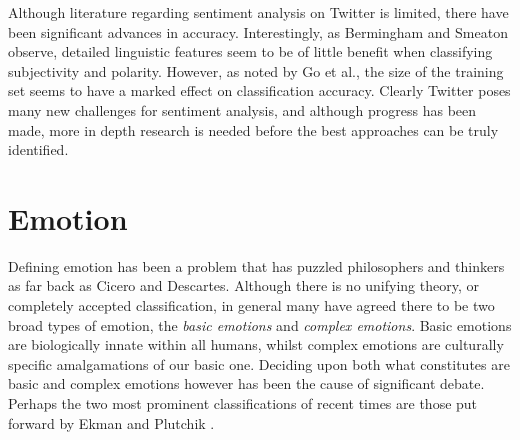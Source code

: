 Although literature regarding sentiment analysis on Twitter is limited, there have been significant advances in accuracy. Interestingly, as Bermingham and Smeaton observe, detailed linguistic features seem to be of little benefit when classifying subjectivity and polarity. However, as noted by Go et al., the size of the training set seems to have a marked effect on classification accuracy. Clearly Twitter poses many new challenges for sentiment analysis, and although progress has been made, more in depth research is needed before the best approaches can be truly identified.

\begin{comment}

Understanding sentiment on Twitter however, requires slight changes to our approach. We will assume that opinion expressed within a tweet is the user's own, and that the time at which a tweet is posted reflects the time at which any opinion in it was cast. This leaves us with three core problems. First we must determine whether a tweet contains an opinion, and if so, we must be able to both classify it and determine it's topic. Research into Twitter-targeted sentiment analysis is limited, however, due to the length constraints placed upon tweets, aspects of sentence-level classification still bare relevance. Furthemore work such as Bermingham' \cite{Bermingham:2010vh} and Barbosa's \cite{Barbosa:ws} highlight some key variations in approach to sentiment analysis on Twitter.

\cite{Barbosa:ws} - suggests 2-step framework, subjectivity detetction then classification
\cite{Barbosa:ws} - additional features from tweet syntax

Robust sentiment detection \cite{Barbosa:ws}
	- good overview

Identifying themes/sentiment \cite{KumarPal:2010fd}
- good topic extraction

Is brevity an advantage? \cite{Bermingham:2010vh}

Sentiment in twitter events \cite{Thelwall:to}

Distant supervision \cite{Go:2009ut}

\end{comment}

\section{Emotion}
\label{background:emotion}

Defining emotion has been a problem that has puzzled philosophers and thinkers as far back as Cicero and Descartes. Although there is no unifying theory, or completely accepted classification, in general many have agreed there to be two broad types of emotion, the \emph{basic emotions} and \emph{complex emotions}. Basic emotions are biologically innate within all humans, whilst complex emotions are culturally specific amalgamations of our basic one. Deciding upon both what constitutes are basic and complex emotions however has been the cause of significant debate. Perhaps the two most prominent classifications of recent times are those put forward by Ekman \cite{Ekman:1969ux} and Plutchik \cite{Plutchik:2001tp}. 

